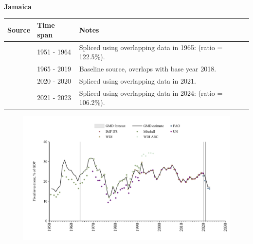 \documentclass[12pt,a4paper,landscape]{article}
\begin{document}
\begin{adjustbox}{max totalsize={\paperwidth}{\paperheight},center}
\begin{minipage}[t][\textheight][t]{\textwidth}
\vspace*{0.5cm}
{}
\begin{center}
{\Large\bfseries Jamaica}
\end{center}
\vspace{0.5cm}
\begin{table}[H]
\centering
\small
\begin{tabular}{|l|l|l|}
\hline
\textbf{Source} & \textbf{Time span} & \textbf{Notes} \\
\hline
\rowcolor{white}\cite{Mitchell}& 1951 - 1964 &Spliced using overlapping data in 1965: (ratio = 122.5\%).\\
\rowcolor{lightgray}\cite{WDI}& 1965 - 2019 &Baseline source, overlaps with base year 2018.\\
\rowcolor{white}\cite{UN}& 2020 - 2020 &Spliced using overlapping data in 2021.\\
\rowcolor{lightgray}\cite{FAO}& 2021 - 2023 &Spliced using overlapping data in 2024: (ratio = 106.2\%).\\
\hline
\end{tabular}
\end{table}
\begin{figure}[H]
\centering
\includegraphics[width=\textwidth,height=0.6\textheight,keepaspectratio]{graphs/JAM_finv_GDP.pdf}
\end{figure}
\end{minipage}
\end{adjustbox}
\end{document}
